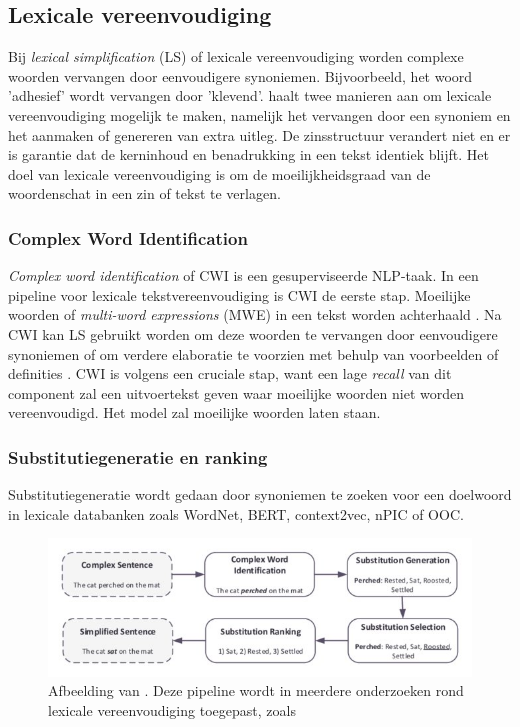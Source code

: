 \subsection{Lexicale vereenvoudiging}

Bij \textit{lexical simplification} (LS) of lexicale vereenvoudiging worden complexe woorden vervangen door eenvoudigere synoniemen. Bijvoorbeeld, het woord 'adhesief' wordt vervangen door 'klevend'. \textcite{Kandula2010} haalt twee manieren aan om lexicale vereenvoudiging mogelijk te maken, namelijk het vervangen door een synoniem en het aanmaken of genereren van extra uitleg. De zinsstructuur verandert niet en er is garantie dat de kerninhoud en benadrukking in een tekst identiek blijft. Het doel van lexicale vereenvoudiging is om de moeilijkheidsgraad van de woordenschat in een zin of tekst te verlagen. 

\subsubsection{Complex Word Identification}

\textit{Complex word identification} of CWI is een gesuperviseerde NLP-taak. In een pipeline voor lexicale tekstvereenvoudiging is CWI de eerste stap. Moeilijke woorden of \textit{multi-word expressions} (MWE) in een tekst worden achterhaald  \autocite{Shardlow2013, Gooding2019}. Na CWI kan LS gebruikt worden om deze woorden te vervangen door eenvoudigere synoniemen of om verdere elaboratie te voorzien met behulp van voorbeelden of definities \autocite{Zeng2005, Kandula2010}. CWI is volgens \textcite{Shardlow2013} een cruciale stap, want een lage \textit{recall} van dit component zal een uitvoertekst geven waar moeilijke woorden niet worden vereenvoudigd. Het model zal moeilijke woorden laten staan.

\subsubsection{Substitutiegeneratie en ranking}

Substitutiegeneratie wordt gedaan door synoniemen te zoeken voor een doelwoord in lexicale databanken zoals WordNet, BERT, context2vec, nPIC of OOC. 

\begin{figure}[H]
	\includegraphics{img/lexical-simplification-pipeline.png}
	\caption{Afbeelding van \textcite{Althunayyan2021}. Deze pipeline wordt in meerdere onderzoeken rond lexicale vereenvoudiging toegepast, zoals \textcite{Paetzold2016, Bingel2018, Bulte2018}}
\end{figure}

